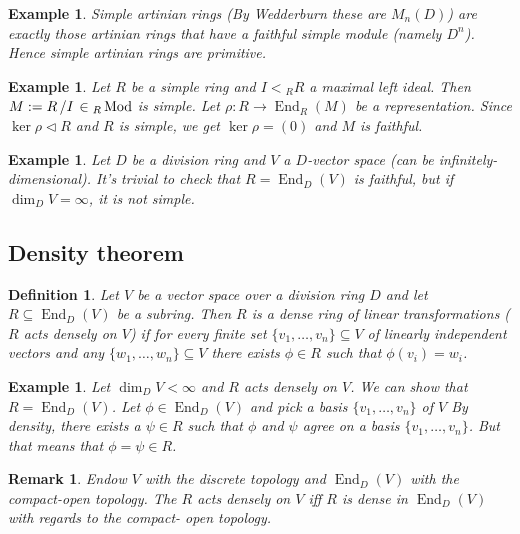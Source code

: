 \documentclass[10pt, a4paper]{article}
\newtheorem{defi}[thm]{Definition}
\newenvironment{noticeB}{%
  \tcolorbox[%
  notitle,
  empty,
  enhanced,  %
  breakable,
  coltext=black,
  colback=white, 
  fontupper=\rmfamily,
  noparskip,
  sharp corners,
  boxrule=-1pt,  %
  frame hidden,
  left=7pt,  %
  right=7pt,
  top=5pt,
  bottom=5pt,
  before skip=2.5ex plus 2pt,
  after skip=2.5ex plus 2pt,
  borderline west = {1.5pt}{-0.1pt}{blue!30!black}, %
  overlay unbroken and last={%
    \draw[color=black, line width=1.25pt]
    ($(frame.south west)+(1.pt, -0.1pt)$) -- ++(2em, 0);
  }
  ]}
{\endtcolorbox}
\newenvironment{definition}{\begin{noticeB}\begin{defi}}{%
    \end{defi}\end{noticeB}}
\newtheorem*{remark}{Remark}
\newtheorem{example}[thm]{Example}
\newcommand{\quot}[2]{{\raisebox{0em}{$#1$}\left/\raisebox{0em}{$#2$}\right.}}
\DeclareMathOperator{\en}{End}
\DeclareMathOperator{\mo}{Mod}
\begin{document}
\begin{example}
  Simple artinian rings (By Wedderburn these are $M_n (D)$)
  are exactly those artinian rings that have a faithful simple module (namely $D^n$).
  Hence simple artinian rings are primitive.
\end{example}

\begin{example}
  Let $R$ be a simple ring and $I < {}_R R$ a maximal left ideal.
  Then $M:= \quot{R}{I} \in {}_R \mo$ is simple.
  Let $\rho: R \to \en_R (M)$ be a representation.
  Since $\ker \rho \lhd R$ and $R$ is simple, we get $\ker \rho = (0)$ and $M$ is faithful.
\end{example}

\begin{example}
  Let $D$ be a division ring and $V$ a $D$-vector space (can be infinitely-dimensional).
  It's trivial to check that $R = \en_D (V)$ is faithful, but if $\dim_D V = \infty$, it is not simple.
\end{example}

\subsection{Density theorem}

\begin{definition}
  Let $V$ be a vector space over a division ring $D$ and let $R \subseteq \en_D (V)$ be a subring.
  Then $R$ is a dense ring of linear transformations ($R$ acts densely on $V$) if for every finite set $\{v_1, \dots, v_n\} \subseteq V$ of linearly independent vectors and any 
  $\{w_1, \dots, w_n\} \subseteq V$ there exists $\phi \in R$ such that $\phi(v_i) = w_i$.
\end{definition}

\begin{example}
  Let $\dim_D V < \infty$ and $R$ acts densely on $V$.
  We can show that $R = \en_D (V)$. Let $\phi \in \en_D (V)$ and pick a basis $\{v_1, \dots, v_n\}$ of $V$
  By density, there exists a $\psi \in R$ such that $\phi$ and $\psi$ agree on a basis $\{v_1, \dots, v_n\}$.
  But that means that $\phi = \psi \in R$.
\end{example}

\begin{remark}
  Endow $V$ with the discrete topology and $\en_D (V)$ with the compact-open topology.
  The $R$ acts densely on $V$ iff $R$ is dense in $\en_D (V)$ with regards to the compact- open topology.
\end{remark}
\end{document}
